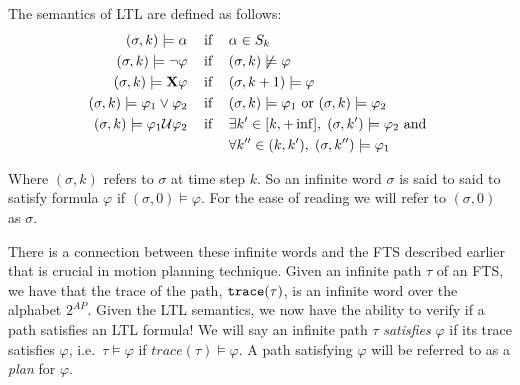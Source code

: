 \theoremstyle{definition}
\begin{definition}
\label{defLTLS}
The semantics of LTL are defined as follows:
\begin{align*}
(\sigma,k) \models \alpha \hspace{0.3cm}\text{ if }\hspace{0.3cm}& \alpha \in S_k \\
(\sigma,k) \models \neg \varphi \hspace{0.3cm}\text{ if }\hspace{0.3cm}& (\sigma, k) \not \models \varphi \\
(\sigma,k) \models \textbf{X} \varphi \hspace{0.3cm}\text{ if }\hspace{0.3cm}& (\sigma, k+1) \models \varphi \\
(\sigma,k) \models \varphi_1 \lor \varphi_2 \hspace{0.3cm}\text{ if }\hspace{0.3cm}& (\sigma,k) \models \varphi_1 \text{ or } (\sigma,k) \models \varphi_2 \\
(\sigma,k) \models \varphi_1 \mathcal{U} \varphi_2 \hspace{0.3cm}\text{ if }\hspace{0.3cm}& \exists k' \in [k,+\inf ], \hspace{0.1cm} (\sigma ,k') \models \varphi_2 \text{ and } \\ &\forall k'' \in (k,k'), \hspace{0.1cm} (\sigma, k'') \models \varphi_1 
\end{align*}
\end{definition}
Where $(\sigma,k)$  refers to $\sigma$ at time step $k$. So an infinite word $\sigma$ is said to said to satisfy formula $\varphi$ if $(\sigma,0) \models \varphi$. For the ease of reading we will refer to $(\sigma,0)$ as $\sigma$. 

There is a connection between these infinite words and the FTS described earlier that is crucial in motion planning technique. Given an infinite path $\tau$ of an FTS, we have that the trace of the path, $\texttt{trace}(\tau)$, is an infinite word over the alphabet $2^{AP}$. Given the LTL semantics, we now have the ability to verify if a path satisfies an LTL formula! We will say an infinite path $\tau$ \textit{satisfies} $\varphi$ if its trace satisfies $\varphi$, i.e.\ $\tau \models \varphi$ if $trace(\tau) \models \varphi$. A path satisfying $\varphi$ will be referred to as a \textit{plan} for $\varphi$.




